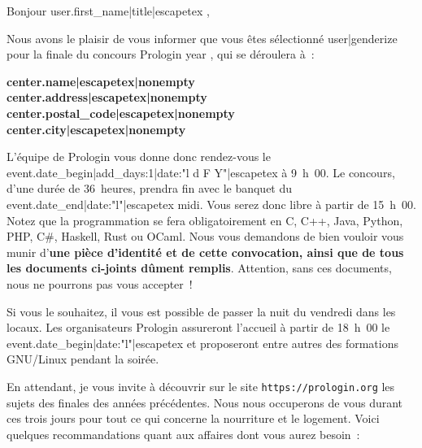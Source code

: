 \documentclass[a4paper,11pt]{article}
\begin{document}
\def\objet{Convocation à la finale Prologin {{ year }} }

{%
{%

\def\destinataire{%
{{ user.get_full_name|title|escapetex|nonempty }}\\
{{ user.address|escapetex|nonempty }}\\
{{ user.postal_code|escapetex|nonempty }} {{ user.city|escapetex|nonempty }}\\
{{ user.country|escapetex|nonempty }} %
}
\header

Bonjour {{ user.first_name|title|escapetex }},

Nous avons le plaisir de vous informer que vous êtes
sélectionné{{ user|genderize }}
pour la finale du concours Prologin {{ year }}, qui se déroulera à~:

{\par\smallskip\noindent\centering
\begin{minipage}{0.5\textwidth}
\textbf{%
{{ center.name|escapetex|nonempty }}%
}\\
\textbf{%
{{ center.address|escapetex|nonempty }}%
}\\
\textbf{%
{{ center.postal_code|escapetex|nonempty }} {{ center.city|escapetex|nonempty }}%
}
\end{minipage}
\par\smallskip}

L'équipe de Prologin vous donne donc rendez-vous le {{ event.date_begin|add_days:1|date:"l d F Y"|escapetex }}
à 9~h~00. Le concours, d'une durée de 36~heures, prendra fin avec le banquet du
{{ event.date_end|date:"l"|escapetex }} midi. Vous serez donc libre à partir de 15~h~00. Notez que la
programmation se fera obligatoirement en C, C++, Java, Python, PHP, C\#,
Haskell, Rust ou OCaml. Nous vous demandons de bien vouloir vous munir d'\textbf{une
pièce d'identité et de cette convocation, ainsi que de tous les documents
ci-joints dûment remplis}. Attention, sans ces documents, nous ne pourrons pas
vous accepter~!

Si vous le souhaitez, il vous est possible de passer la nuit du vendredi dans
les locaux. Les organisateurs Prologin assureront l'accueil à partir de 18~h~00
le {{ event.date_begin|date:"l"|escapetex }} et proposeront entre autres des
formations GNU/Linux pendant la soirée.

En attendant, je vous invite à découvrir sur le site
\texttt{https://prologin.org} les sujets des finales des années précédentes.
Nous nous occuperons de vous durant ces trois jours pour tout ce qui concerne
la nourriture et le logement. Voici quelques recommandations quant aux affaires
dont vous aurez besoin~:

}}
\end{document}
